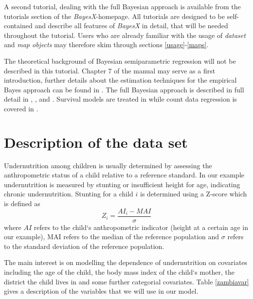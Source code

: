 \documentclass[a4paper]{article}
\begin{document}
A second tutorial, dealing with the full Bayesian approach is
available from the tutorials section of the {\it BayesX}-homepage.
All tutorials are designed to be self-contained and describe all
features of {\it BayesX} in detail, that will be needed throughout
the tutorial. Users who are already familiar with the usage of
{\it dataset} and {\it map objects} may therefore skim through
sections \ref{usage}-\ref{maps}.

The theoretical background of Bayesian semiparametric regression
will not be described in this tutorial. Chapter 7 of the manual may
serve as a first introduction, further details about the estimation
techniques for the empirical Bayes approach can be found in
. The full Bayesian
approach is described in full detail in , ,
 and . Survival models are
treated in  while count data
regression is covered in .

\section{Description of the data set}

Undernutrition among children is usually determined by assessing
the anthropometric status of a child relative to a reference
standard. In our example undernutrition is measured by stunting or
insufficient height for age, indicating chronic undernutrition.
Stunting for a child $i$ is determined using a Z-score which is
defined as
\[Z_i = \frac{AI_i-MAI}{\sigma}\]
where $AI$ refers to the child`s anthropometric indicator (height
at a certain age in our example), MAI refers to the median of the
reference population and $\sigma$ refers to the standard deviation
of the reference population.

The main interest is on modelling the dependence of undernutrition
on covariates including the age of the child, the body mass index
of the child`s mother, the district the child lives in and some
further categorial covariates. Table \ref{zambiavar} gives a
description of the variables that we will use in our model.
\end{document}
